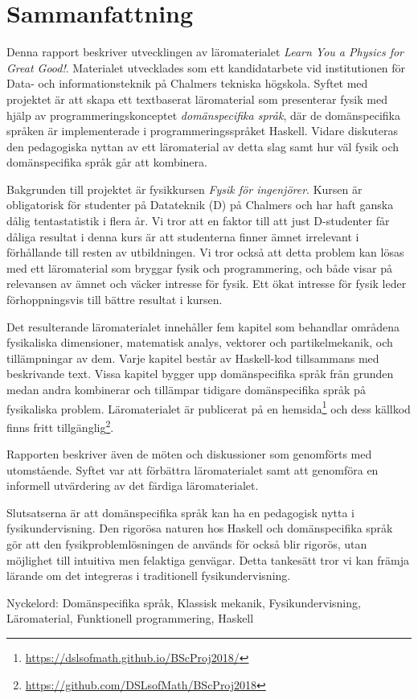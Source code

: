 
\thispagestyle{plain}			%

\section*{Sammanfattning}

Denna rapport beskriver utvecklingen av läromaterialet \textit{Learn You a
Physics for Great Good!}. Materialet utvecklades som ett kandidatarbete vid
institutionen för Data- och informationsteknik på Chalmers tekniska högskola.
Syftet med projektet är att skapa ett textbaserat läromaterial som presenterar
fysik med hjälp av programmeringskonceptet \textit{domänspecifika språk}, där de
domänspecifika språken är implementerade i programmeringsspråket Haskell. Vidare
diskuteras den pedagogiska nyttan av ett läromaterial av detta slag samt hur
väl fysik och domänspecifika språk går att kombinera.

Bakgrunden till projektet är fysikkursen \textit{Fysik för ingenjörer}. Kursen
är obligatorisk för studenter på Datateknik (D) på Chalmers och har haft ganska
dålig tentastatistik i flera år. Vi tror att en faktor till att just D-studenter
får dåliga resultat i denna
kurs är att studenterna finner ämnet irrelevant i förhållande till
resten av utbildningen. Vi tror också att detta problem kan lösas med ett
läromaterial som bryggar fysik och
programmering, och både visar på relevansen av ämnet och väcker
intresse för fysik. Ett ökat intresse för fysik leder förhoppningsvis
till bättre resultat i kursen.

Det resulterande läromaterialet innehåller fem kapitel som
behandlar områdena fysikaliska dimensioner, matematisk analys,
vektorer och partikelmekanik, och tillämpningar av dem. Varje kapitel
består av Haskell-kod tillsammans med beskrivande
text. Vissa kapitel bygger upp domänspecifika språk från grunden medan
andra kombinerar och tillämpar tidigare domänspecifika språk på
fysikaliska problem. Läromaterialet är publicerat på en hemsida\footnote{\url{https://dslsofmath.github.io/BScProj2018/}}
och dess källkod finns
fritt tillgänglig\footnote{\url{https://github.com/DSLsofMath/BScProj2018}}.

Rapporten beskriver
även de möten och diskussioner som genomförts med utomstående. Syftet var att
förbättra läromaterialet samt att genomföra en informell utvärdering av det
färdiga läromaterialet.

Slutsatserna är att
domänspecifika språk kan ha en pedagogisk nytta i
fysikundervisning. Den
rigorösa naturen hos Haskell och domänspecifika språk gör att
den fysikproblemlösningen de används för också blir
rigorös, utan möjlighet till intuitiva men felaktiga
genvägar. Detta tankesätt tror vi kan främja lärande om det integreras i
traditionell fysikundervisning.

\vfill
Nyckelord: Domänspecifika språk, Klassisk mekanik, Fysikundervisning, Läromaterial, Funktionell programmering, Haskell

\newpage				%
\thispagestyle{empty}
\mbox{}
